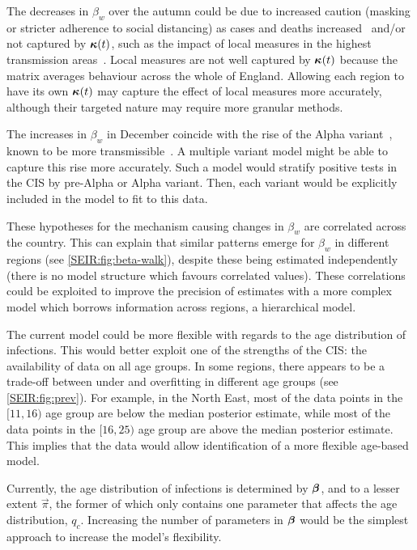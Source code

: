 \documentclass[thesis.tex]{subfiles}
\begin{document}
The decreases in $\beta_w$ over the autumn could be due to increased caution (\eg masking or stricter adherence to social distancing) as cases and deaths increased~\autocite{jarvisEffect} and/or not captured by $\bm{\kappa}(t)$, such as the impact of local measures in the highest transmission areas~\autocite{scottCovid19}.
Local measures are not well captured by $\bm{\kappa}(t)$ because the matrix averages behaviour across the whole of England.
Allowing each region to have its own $\bm{\kappa}(t)$ may capture the effect of local measures more accurately, although their targeted nature may require more granular methods.

The increases in $\beta_w$ in December coincide with the rise of the Alpha variant~\autocite{lythgoeLineage}, known to be more transmissible~\autocite[e.g.][]{daviesEstimated}.
A multiple variant model might be able to capture this rise more accurately.
Such a model would stratify positive tests in the CIS by pre-Alpha or Alpha variant.
Then, each variant would be explicitly included in the model to fit to this data.

These hypotheses for the mechanism causing changes in $\beta_w$ are correlated across the country.
This can explain that similar patterns emerge for $\beta_w$ in different regions (see \cref{SEIR:fig:beta-walk}), despite these being estimated independently (\ie there is no model structure which favours correlated values).
These correlations could be exploited to improve the precision of estimates with a more complex model which borrows information across regions, \eg a hierarchical model.

The current model could be more flexible with regards to the age distribution of infections.
This would better exploit one of the strengths of the CIS: the availability of data  on all age groups.
In some regions, there appears to be a trade-off between under and overfitting in different age groups (see \cref{SEIR:fig:prev}).
For example, in the North East, most of the data points in the $[11, 16)$ age group are below the median posterior estimate, while most of the data points in the $[16, 25)$ age group are above the median posterior estimate.
This implies that the data would allow identification of a more flexible age-based model.

Currently, the age distribution of infections is determined by $\bm{\beta}$, and to a lesser extent $\vec{\pi}$, the former of which only contains one parameter that affects the age distribution, $q_c$.
Increasing the number of parameters in $\bm{\beta}$ would be the simplest approach to increase the model's flexibility.
\end{document}
